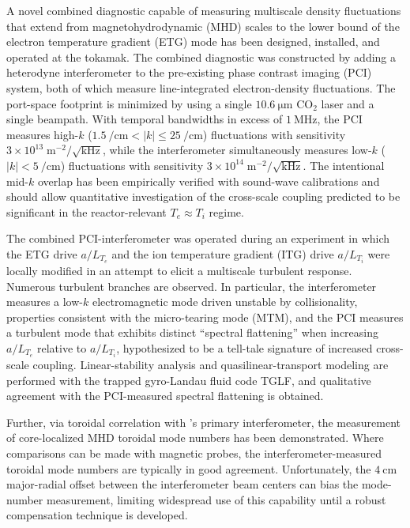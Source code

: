 %
%
%

A novel combined diagnostic capable of measuring multiscale
density fluctuations that extend from
magnetohydrodynamic (MHD) scales to
the lower bound of the electron temperature gradient (ETG) mode
has been designed, installed, and operated at the \diiid\space tokamak.
The combined diagnostic was constructed by adding a heterodyne interferometer
to the pre-existing phase contrast imaging (PCI) system,
both of which measure line-integrated electron-density fluctuations.
The port-space footprint is minimized by using
a single $\SI{10.6}{\micro\meter}$ CO$_2$ laser and
a single beampath.
With temporal bandwidths in excess of $\SI{1}{\mega\hertz}$,
the PCI measures high-$k$
($\SI{1.5}{\per\centi\meter} < |k| \leq \SI{25}{\per\centi\meter}$)
fluctuations with
sensitivity $3 \times 10^{13} \; \text{m}^{-2} / \sqrt{\text{kHz}}$, while
the interferometer simultaneously measures low-$k$
($|k| < \SI{5}{\per\centi\meter}$) fluctuations with
sensitivity $3 \times 10^{14} \; \text{m}^{-2} / \sqrt{\text{kHz}}$.
The intentional mid-$k$ overlap
has been empirically verified with sound-wave calibrations and
should allow quantitative investigation of the cross-scale coupling
predicted to be significant in the reactor-relevant $T_e \approx T_i$ regime.

The combined PCI-interferometer was operated during an experiment
in which the ETG drive $a / L_{T_e}$ and
the ion temperature gradient (ITG) drive $a / L_{T_i}$
were locally modified in an attempt to elicit
a multiscale turbulent response.
Numerous turbulent branches are observed.
In particular, the interferometer measures
a low-$k$ electromagnetic mode driven unstable by collisionality,
properties consistent with the micro-tearing mode (MTM), and
the PCI measures a turbulent mode
that exhibits distinct ``spectral flattening''
when increasing $a / L_{T_e}$ relative to $a / L_{T_i}$,
hypothesized to be a tell-tale signature
of increased cross-scale coupling.
Linear-stability analysis and quasilinear-transport modeling
are performed with the trapped gyro-Landau fluid code TGLF, and
qualitative agreement with the PCI-measured spectral flattening
is obtained.

Further, via toroidal correlation with \diiid's primary interferometer,
the measurement of core-localized MHD toroidal mode numbers
has been demonstrated.
Where comparisons can be made with magnetic probes,
the interferometer-measured toroidal mode numbers
are typically in good agreement.
Unfortunately, the $\SI{4}{\centi\meter}$ major-radial offset
between the interferometer beam centers
can bias the mode-number measurement,
limiting widespread use of this capability
until a robust compensation technique is developed.
